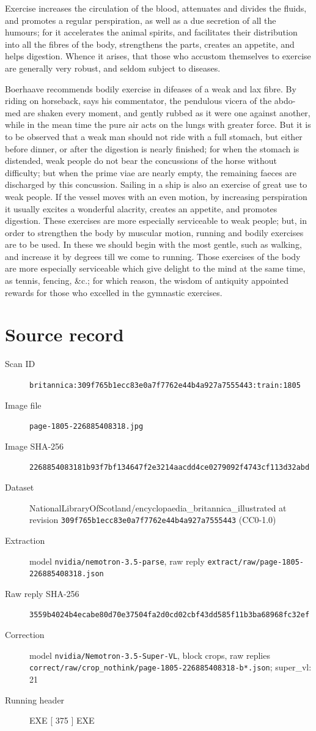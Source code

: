\documentclass{article}
\begin{document}
Exercise increases the circulation of the blood, attenuates and divides the fluids, and promotes a regular perspiration, as well as a due secretion of all the humours; for it accelerates the animal spirits, and facilitates their distribution into all the fibres of the body, strengthens the parts, creates an appetite, and helps digestion. Whence it arises, that those who accustom themselves to exercise are generally very robust, and seldom subject to diseases.

Boerhaave recommends bodily exercise in difeases of a weak and lax fibre. By riding on horseback, says his commentator, the pendulous vicera of the abdo- med are shaken every moment, and gently rubbed as it were one against another, while in the mean time the pure air acts on the lungs with greater force. But it is to be observed that a weak man should not ride with a full stomach, but either before dinner, or after the digestion is nearly finished; for when the stomach is distended, weak people do not bear the concussions of the horse without difficulty; but when the prime viae are nearly empty, the remaining faeces are discharged by this concussion. Sailing in a ship is also an exercise of great use to weak people. If the vessel moves with an even motion, by increasing perspiration it usually excites a wonderful alacrity, creates an appetite, and promotes digestion. These exercises are more especially serviceable to weak people; but, in order to strengthen the body by muscular motion, running and bodily exercises are to be used. In these we should begin with the most gentle, such as walking, and increase it by degrees till we come to running. Those exercises of the body are more especially serviceable which give delight to the mind at the same time, as tennis, fencing, \&c.; for which reason, the wisdom of antiquity appointed rewards for those who excelled in the gymnastic exercises.


\section*{Source record}
\begin{description}
\item[Scan ID] \texttt{britannica:309f765b1ecc83e0a7f7762e44b4a927a7555443:train:1805}
\item[Image file] \texttt{page-1805-226885408318.jpg}
\item[Image SHA-256] \texttt{2268854083181b93f7bf134647f2e3214aacdd4ce0279092f4743cf113d32abd}
\item[Dataset] NationalLibraryOfScotland/encyclopaedia\_britannica\_illustrated at revision \texttt{309f765b1ecc83e0a7f7762e44b4a927a7555443} (CC0-1.0)
\item[Extraction] model \texttt{nvidia/nemotron-3.5-parse}, raw reply \texttt{extract/raw/page-1805-226885408318.json}
\item[Raw reply SHA-256] \texttt{3559b4024b4ecabe80d70e37504fa2d0cd02cbf43dd585f11b3ba68968fc32ef}
\item[Correction] model \texttt{nvidia/Nemotron-3.5-Super-VL}, block crops, raw replies \texttt{correct/raw/crop\_nothink/page-1805-226885408318-b*.json}; super\_vl: 21
\item[Running header] EXE [ 375 ] EXE
\end{description}
\end{document}
